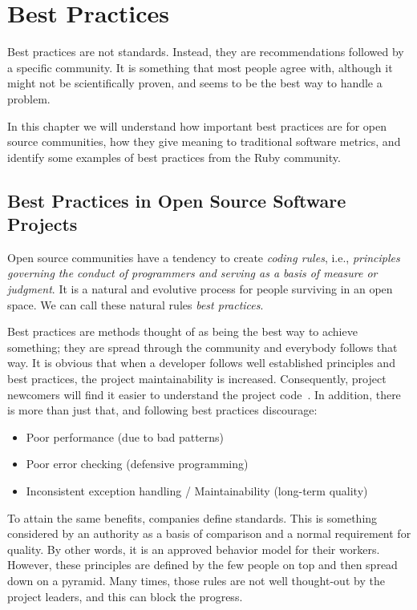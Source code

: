 \thispagestyle{empty}
\chapter{Best Practices}\label{chap:best_practices}

Best practices are not standards. Instead, they are recommendations followed by a specific community.
It is something that most people agree with, although it might not be scientifically proven,
and seems to be the best way to handle a problem.

In this chapter we will understand how important best practices are for open source communities, 
how they give meaning to traditional software metrics,
and identify some examples of best practices from the Ruby community.


\section{Best Practices in Open Source Software Projects} \label{sec:best_practices_ossp}
Open source communities have a tendency to create \emph{coding rules},
i.e., \emph{principles governing the conduct of programmers and serving as a basis of measure or judgment}. 
It is a natural and evolutive process for people surviving in an open space.
We can call these natural rules \emph{best practices}.

Best practices are  methods thought of as being the  best way to achieve something;
they are spread through the community and everybody follows that way.
It is obvious that when a developer follows well established principles and best practices, 
the project maintainability is increased.
Consequently, project newcomers will find it easier to understand the project code~\cite{dromey2002model}.
In addition, there is more than just that, and following best practices discourage:
\begin{itemize}
\item Poor performance (due to bad patterns)
\item Poor error checking (defensive programming)
\item Inconsistent exception handling / Maintainability (long-term quality)
\end{itemize}

To attain the same benefits, companies define standards. This is something considered by an authority 
as a basis of comparison and a normal requirement for quality.
By other words, it is an approved behavior model for their workers.
However, these principles are defined by the few people on top and then spread down on a pyramid.
Many times, those rules are not well thought-out by the project leaders, and this can block the progress.


